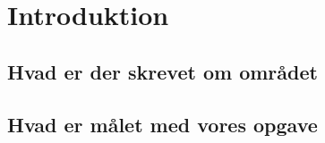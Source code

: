 \section{Introduktion}
\subsection{Hvad er der skrevet om området}


\subsection{Hvad er målet med vores opgave}

